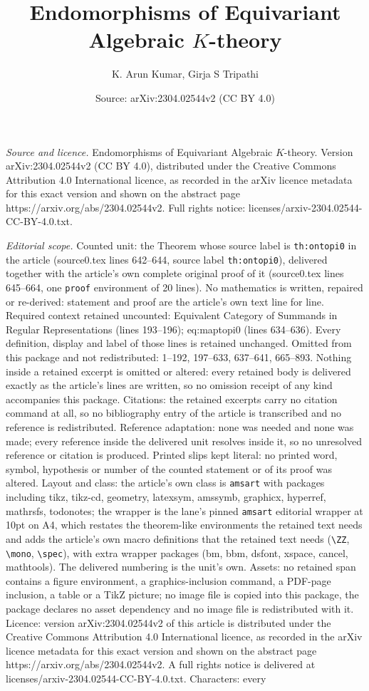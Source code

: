 \documentclass[10pt,a4paper]{amsart}
\title[Endomorphisms of Equivariant Algebraic $K$-theory]{Endomorphisms of Equivariant Algebraic $K$-theory}
\author{K. Arun Kumar, Girja S Tripathi}
\date{Source: arXiv:2304.02544v2 (CC BY 4.0)}
\begin{document}
\maketitle

\noindent\emph{Source and licence.} Endomorphisms of Equivariant Algebraic $K$-theory. Version arXiv:2304.02544v2 (CC BY 4.0), distributed under the Creative Commons Attribution 4.0 International licence, as recorded in the arXiv licence metadata for this exact version and shown on the abstract page https://arxiv.org/abs/2304.02544v2. Full rights notice: licenses/arxiv-2304.02544-CC-BY-4.0.txt.\par\smallskip

\noindent\textit{Editorial scope.} Counted unit: the Theorem whose source label is \texttt{th:ontopi0} in the article (source0.tex lines 642--644, source label \texttt{th:ontopi0}), delivered together with the article's own complete original proof of it (source0.tex lines 645--664, one \texttt{proof} environment of 20 lines). No mathematics is written, repaired or re-derived: statement and proof are the article's own text line for line. Required context retained uncounted: Equivalent Category of Summands in Regular Representations (lines 193--196); eq:maptopi0 (lines 634--636). Every definition, display and label of those lines is retained unchanged. Omitted from this package and not redistributed: 1--192, 197--633, 637--641, 665--893. Nothing inside a retained excerpt is omitted or altered: every retained body is delivered exactly as the article's lines are written, so no omission receipt of any kind accompanies this package. Citations: the retained excerpts carry no citation command at all, so no bibliography entry of the article is transcribed and no reference is redistributed. Reference adaptation: none was needed and none was made; every reference inside the delivered unit resolves inside it, so no unresolved reference or citation is produced. Printed slips kept literal: no printed word, symbol, hypothesis or number of the counted statement or of its proof was altered. Layout and class: the article's own class is \texttt{amsart} with packages including tikz, tikz-cd, geometry, latexsym, amssymb, graphicx, hyperref, mathrsfs, todonotes; the wrapper is the lane's pinned \texttt{amsart} editorial wrapper at 10pt on A4, which restates the theorem-like environments the retained text needs and adds the article's own macro definitions that the retained text needs (\texttt{\textbackslash ZZ}, \texttt{\textbackslash mono}, \texttt{\textbackslash spec}), with extra wrapper packages (bm, bbm, dsfont, xspace, cancel, mathtools). The delivered numbering is the unit's own. Assets: no retained span contains a figure environment, a graphics-inclusion command, a PDF-page inclusion, a table or a TikZ picture; no image file is copied into this package, the package declares no asset dependency and no image file is redistributed with it. Licence: version arXiv:2304.02544v2 of this article is distributed under the Creative Commons Attribution 4.0 International licence, as recorded in the arXiv licence metadata for this exact version and shown on the abstract page https://arxiv.org/abs/2304.02544v2. A full rights notice is delivered at licenses/arxiv-2304.02544-CC-BY-4.0.txt. Characters: every 
\end{document}
